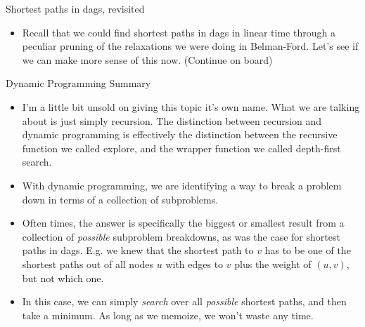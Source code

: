 \documentclass{beamer}
\begin{document}
\begin{frame}{Shortest paths in dags, revisited}
    \begin{itemize}
        \item Recall that we could find shortest paths in dags in linear time through a peculiar pruning of the relaxations we were doing in Belman-Ford. Let's see if we can make more sense of this now. (Continue on board)
    \end{itemize}
\end{frame}

\begin{frame}{Dynamic Programming Summary}
    \begin{itemize}
        \item I'm a little bit unsold on giving this topic it's own name. What we are talking about is just simply recursion. The distinction between recursion and dynamic programming is effectively the distinction between the recursive function we called explore, and the wrapper function we called depth-first search. 
        \item With dynamic programming, we are identifying a way to break a problem down in terms of a collection of subproblems. 
        \item Often times, the answer is specifically the biggest or smallest result from a collection of \emph{possible} subproblem breakdowns, as was the case for shortest paths in dags. E.g. we knew that the shortest path to $v$ has to be one of the shortest paths out of all nodes $u$ with edges to $v$ plus the weight of $(u,v)$, but not which one. 
        \item In this case, we can simply \emph{search} over all \emph{possible} shortest paths, and then take a minimum. As long as we memoize, we won't waste any time. 
    \end{itemize}
\end{frame}
\end{document}
